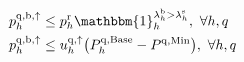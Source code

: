 \documentclass[conference]{IEEEtran}
\begin{document}
\begin{subequations}
\begin{align}
        \  & p^{\rm{q},\rm{b}, \uparrow}_{h} \leq p^{\rm{r}}_h \mathbbm{1}_{h}^{\lambda^{\rm{b}}_{h} > \lambda^{\rm{s}}_{h}} , \                                                                            \forall{h,q}                                                                             \label{power:8q}                                                                                                                                                                                                          \\
        \  & p^{\rm{q},\rm{b}, \uparrow}_{h} \leq u_{h}^{\rm{q},\uparrow} \big(P^{\rm{q},\rm{Base}}_{h} - P^{\rm{q},\rm{Min}}\big) , \                                                                                                       \forall{h,q}                                                                             \label{power:9q}                                                                                                                                                                                                                      \\

\end{align}
\end{subequations}
\end{document}
